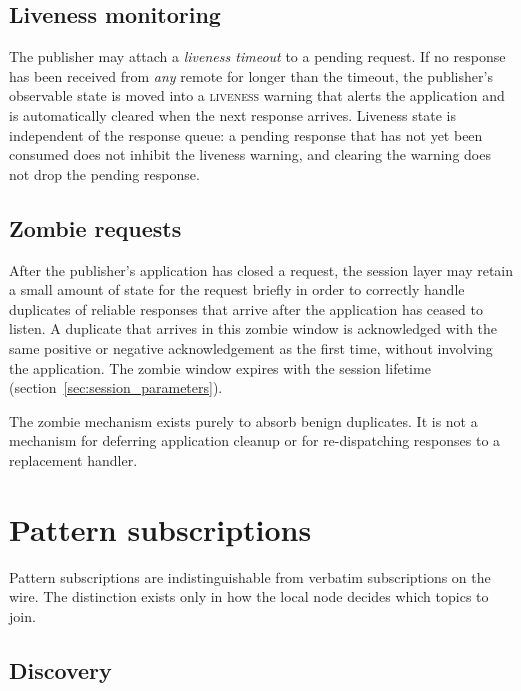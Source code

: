 \subsection{Liveness monitoring}

The publisher may attach a \emph{liveness timeout} to a pending request.
If no response has been received from \emph{any} remote for longer than the
timeout, the publisher's observable state is moved into a \textsc{liveness}
warning that alerts the application and is automatically cleared when the
next response arrives. Liveness state is independent of the response queue:
a pending response that has not yet been consumed does not inhibit the
liveness warning, and clearing the warning does not drop the pending
response.

\subsection{Zombie requests}

After the publisher's application has closed a request, the session layer
may retain a small amount of state for the request briefly in order to
correctly handle duplicates of reliable responses that arrive after the
application has ceased to listen. A duplicate that arrives in this zombie
window is acknowledged with the same positive or negative acknowledgement
as the first time, without involving the application. The zombie window
expires with the session lifetime (section~\ref{sec:session_parameters}).

\begin{remark}
    The zombie mechanism exists purely to absorb benign duplicates. It is
    not a mechanism for deferring application cleanup or for re-dispatching
    responses to a replacement handler.
\end{remark}

\section{Pattern subscriptions}\label{sec:session_patterns}

Pattern subscriptions are indistinguishable from verbatim subscriptions on
the wire. The distinction exists only in how the local node decides which
topics to join.

\subsection{Discovery}


